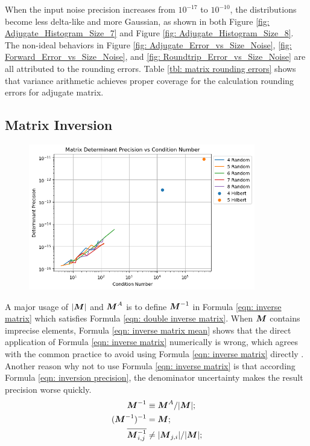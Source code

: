 \documentclass[twoside]{article}
\numberwithin{equation}{section}
\begin{document}
When the input noise precision increases from $10^{-17}$ to  $10^{-10}$, the distributions become less delta-like and more Gaussian, as shown in both Figure \ref{fig: Adjugate_Histogram_Size_7} and Figure \ref{fig: Adjugate_Histogram_Size_8}. 
The non-ideal behaviors in Figure \ref{fig: Adjugate_Error_vs_Size_Noise}, \ref{fig: Forward_Error_vs_Size_Noise}, and \ref{fig: Roundtrip_Error_vs_Size_Noise} are all attributed to the rounding errors.
Table \ref{tbl: matrix rounding errors} shows that variance arithmetic achieves proper coverage for the calculation rounding errors for adjugate matrix.



\subsection{Matrix Inversion}

\begin{figure}[p]
\centering
\includegraphics[height=2.5in]{Matrix_Determinant_Prec_vs_Condition.png} 
\label{fig: Matrix_Determinant_Prec_vs_Condition}
\end{figure}

A major usage of $|\protect{\textrm{\boldmath $M$}}|$ and $\protect{\textrm{\boldmath $M$}}^A$ is to define $\protect{\textrm{\boldmath $M$}}^{-1}$ in Formula \eqref{eqn: inverse matrix} which satisfies Formula \eqref{eqn: double inverse matrix}.
When $\protect{\textrm{\boldmath $M$}}$ contains imprecise elements, Formula \eqref{eqn: inverse matrix mean} shows that the direct application of Formula \eqref{eqn: inverse matrix} numerically is wrong, which agrees with the common practice to avoid using Formula \eqref{eqn: inverse matrix} directly \cite{Numerical_Recipes}.
Another reason why not to use Formula \eqref{eqn: inverse matrix} is that according Formula \eqref{eqn: inversion precision}, the denominator uncertainty makes the result precision worse quickly.
\begin{align}
\label{eqn: inverse matrix}
\protect{\textrm{\boldmath $M$}}^{-1} &\equiv \protect{\textrm{\boldmath $M$}}^A / |\protect{\textrm{\boldmath $M$}}|; \\
\label{eqn: double inverse matrix}
(\protect{\textrm{\boldmath $M$}}^{-1})^{-1} &= \protect{\textrm{\boldmath $M$}}; \\
\label{eqn: inverse matrix mean}
\overline{\protect{\textrm{\boldmath $M$}}_{i,j}^{-1}} &\ne |\protect{\textrm{\boldmath $M$}}_{j,i}| /|\protect{\textrm{\boldmath $M$}}|;
\end{align}
\end{document}
